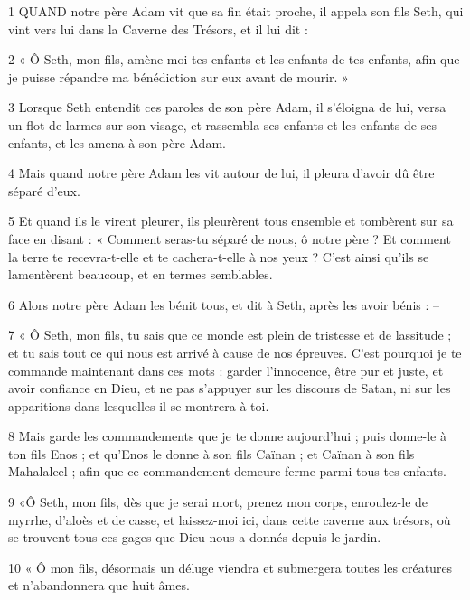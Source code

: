 \par 1 QUAND notre père Adam vit que sa fin était proche, il appela son fils Seth, qui vint vers lui dans la Caverne des Trésors, et il lui dit :

\par 2 « Ô Seth, mon fils, amène-moi tes enfants et les enfants de tes enfants, afin que je puisse répandre ma bénédiction sur eux avant de mourir. »

\par 3 Lorsque Seth entendit ces paroles de son père Adam, il s'éloigna de lui, versa un flot de larmes sur son visage, et rassembla ses enfants et les enfants de ses enfants, et les amena à son père Adam.

\par 4 Mais quand notre père Adam les vit autour de lui, il pleura d'avoir dû être séparé d'eux.

\par 5 Et quand ils le virent pleurer, ils pleurèrent tous ensemble et tombèrent sur sa face en disant : « Comment seras-tu séparé de nous, ô notre père ? Et comment la terre te recevra-t-elle et te cachera-t-elle à nos yeux ? C'est ainsi qu'ils se lamentèrent beaucoup, et en termes semblables.

\par 6 Alors notre père Adam les bénit tous, et dit à Seth, après les avoir bénis : --

\par 7 « Ô Seth, mon fils, tu sais que ce monde est plein de tristesse et de lassitude ; et tu sais tout ce qui nous est arrivé à cause de nos épreuves. C'est pourquoi je te commande maintenant dans ces mots : garder l'innocence, être pur et juste, et avoir confiance en Dieu, et ne pas s'appuyer sur les discours de Satan, ni sur les apparitions dans lesquelles il se montrera à toi.

\par 8 Mais garde les commandements que je te donne aujourd'hui ; puis donne-le à ton fils Enos ; et qu'Enos le donne à son fils Caïnan ; et Caïnan à son fils Mahalaleel ; afin que ce commandement demeure ferme parmi tous tes enfants.

\par 9 «Ô Seth, mon fils, dès que je serai mort, prenez mon corps, enroulez-le de myrrhe, d'aloès et de casse, et laissez-moi ici, dans cette caverne aux trésors, où se trouvent tous ces gages que Dieu nous a donnés depuis le jardin.

\par 10 « Ô mon fils, désormais un déluge viendra et submergera toutes les créatures et n'abandonnera que huit âmes.

